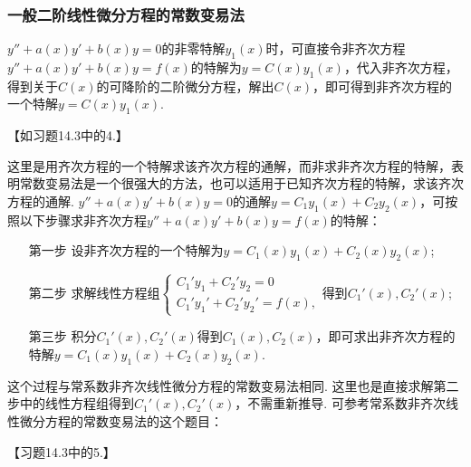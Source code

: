 \documentclass[12pt,UTF8]{ctexart}
\begin{document}
\subsubsection{一般二阶线性微分方程的常数变易法}
\begin{enumerate}
$y''+a(x)y'+b(x)y=0$的非零特解$y_1(x)$时，可直接令非齐次方程$y''+a(x)y'+b(x)y=f(x)$的特解为$y=C(x)y_1(x)$，代入非齐次方程，得到关于$C(x)$的可降阶的二阶微分方程，解出$C(x)$，即可得到非齐次方程的一个特解$y=C(x)y_1(x)$.

【如习题14.3中的4.】

这里是用齐次方程的一个特解求该齐次方程的通解，而非求非齐次方程的特解，表明常数变易法是一个很强大的方法，也可以适用于已知齐次方程的特解，求该齐次方程的通解.
$y''+a(x)y'+b(x)y=0$的通解$y=C_1y_1(x)+C_2y_2(x)$，可按照以下步骤求非齐次方程$y''+a(x)y'+b(x)y=f(x)$的特解：
\begin{enumerate}
\item[第一步]设非齐次方程的一个特解为$y=C_1(x)y_1(x)+C_2(x)y_2(x)$;
\item[第二步]求解线性方程组$\begin{cases}C_1'y_1+C_2'y_2=0\\ C_1'y_1'+C_2'y_2'=f(x),\end{cases}$得到$C_1'(x),C_2'(x)$;
\item[第三步]积分$C_1'(x),C_2'(x)$得到$C_1(x),C_2(x)$，即可求出非齐次方程的特解$y=C_1(x)y_1(x)+C_2(x)y_2(x)$.
\end{enumerate}
这个过程与常系数非齐次线性微分方程的常数变易法相同. 这里也是直接求解第二步中的线性方程组得到$C_1'(x),C_2'(x)$，不需重新推导. 可参考常系数非齐次线性微分方程的常数变易法的这个题目：

【习题14.3中的5.】
\end{enumerate}
\end{document}
